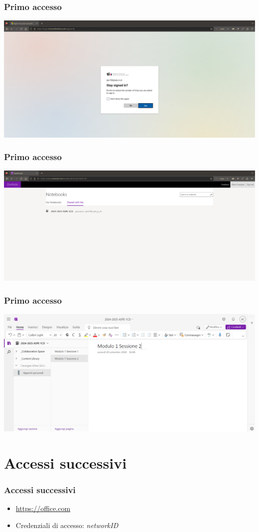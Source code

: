 \documentclass{beamer}
\begin{document}
\begin{frame}
  \frametitle{Primo accesso}
  \begin{center}
    \includegraphics[width=0.8\linewidth]{images/5.png}
  \end{center}
\end{frame}

\begin{frame}
  \frametitle{Primo accesso}
  \begin{center}
    \includegraphics[width=0.8\linewidth]{images/6.png}
  \end{center}
\end{frame}

\begin{frame}
  \frametitle{Primo accesso}
  \begin{center}
    \includegraphics[width=0.8\linewidth]{images/7.png}
  \end{center}
\end{frame}

\section{Accessi successivi}  
\begin{frame}
  \frametitle{Accessi successivi}
  \begin{itemize}
  \item \url{https://office.com}
  \item Credenziali di accesso: \textit{networkID}
  \end{itemize}
\end{frame}
\end{document}
